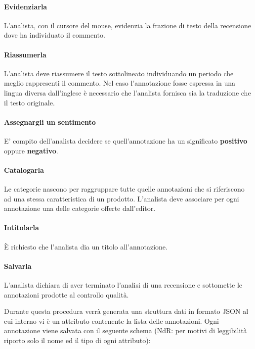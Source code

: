 \paragraph{Evidenziarla}
\label{evidenziarla}
L'analista, con il cursore del mouse, evidenzia la frazione di testo della
recensione dove ha individuato il commento.

\paragraph{Riassumerla}
\label{riassumerla}
L'analista deve riassumere il testo sottolineato individuando un periodo che
meglio rappresenti il commento. Nel caso l'annotazione fosse espressa in una
lingua diversa dall'inglese è necessario che l'analista fornisca sia la
traduzione che il testo originale.

\paragraph{Assegnargli un sentimento}
\label{sentimento}
E' compito dell'analista decidere se quell'annotazione ha un significato
\textbf{positivo} oppure \textbf{negativo}.

\paragraph{Catalogarla}
\label{catalogarla}
Le categorie nascono per raggruppare tutte quelle annotazioni che si
riferiscono ad una stessa caratteristica di un prodotto. L'analista deve
associare per ogni annotazione una delle categorie offerte dall'editor.

\paragraph{Intitolarla}
\label{intitolarla}
È richiesto che l'analista dia un titolo all'annotazione.

\paragraph{Salvarla}
\label{salvarla}
L'analista dichiara di aver terminato l'analisi di una recensione e sottomette
le annotazioni prodotte al controllo qualità.

Durante questa procedura verrà generata una struttura dati in formato \gls{JSON}
al cui interno vi è un attributo contenente la lista delle annotazioni. Ogni
annotazione viene salvata con il seguente schema (NdR: per motivi di leggibilità
riporto solo il nome ed il tipo di ogni attributo):

